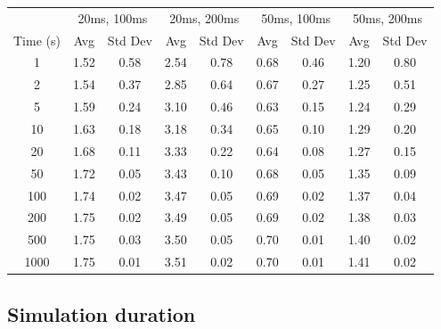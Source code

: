 \begin{table}[h]
\centering
\label{tab:performance}
\begin{tabular}{c|cc|cc|cc|cc}
 & \multicolumn{2}{c|}{20ms, 100ms} & \multicolumn{2}{c|}{20ms, 200ms} & \multicolumn{2}{c|}{50ms, 100ms} & \multicolumn{2}{c}{50ms, 200ms} \\
 Time (s) & Avg & Std Dev & Avg & Std Dev & Avg & Std Dev & Avg & Std Dev \\
\midrule
1 & 1.52 & 0.58 & 2.54 & 0.78 & 0.68 & 0.46 & 1.20 & 0.80 \\
2 & 1.54 & 0.37 & 2.85 & 0.64 & 0.67 & 0.27 & 1.25 & 0.51 \\
5 & 1.59 & 0.24 & 3.10 & 0.46 & 0.63 & 0.15 & 1.24 & 0.29 \\
10 & 1.63 & 0.18 & 3.18 & 0.34 & 0.65 & 0.10 & 1.29 & 0.20 \\
20 & 1.68 & 0.11 & 3.33 & 0.22 & 0.64 & 0.08 & 1.27 & 0.15 \\
50 & 1.72 & 0.05 & 3.43 & 0.10 & 0.68 & 0.05 & 1.35 & 0.09 \\
100 & 1.74 & 0.02 & 3.47 & 0.05 & 0.69 & 0.02 & 1.37 & 0.04 \\
200 & 1.75 & 0.02 & 3.49 & 0.05 & 0.69 & 0.02 & 1.38 & 0.03 \\
500 & 1.75 & 0.03 & 3.50 & 0.05 & 0.70 & 0.01 & 1.40 & 0.02 \\
1000 & 1.75 & 0.01 & 3.51 & 0.02 & 0.70 & 0.01 & 1.41 & 0.02 \\
\end{tabular}
\end{table}

    


\subsection{Simulation duration}